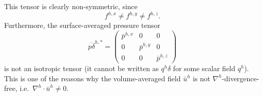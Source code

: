 \documentclass[preprint,twocolumn,5p]{elsarticle}
\begin{document}
This tensor is clearly non-symmetric, since
\begin{equation}
    f^{h, x} \neq f^{h, y} \neq f^{h, z}.
\end{equation}
Furthermore, the surface-averaged pressure tensor
\begin{equation}
    \overline{p \delta}^{h, *} =
    \begin{pmatrix}
        \bar{p}^{h, x} & 0 & 0 \\
        0 & \bar{p}^{h, y} & 0 \\
        0 & 0 & \bar{p}^{h, z}
    \end{pmatrix}
\end{equation}
is not an isotropic tensor
(it cannot be written as $q^h \delta$ for some scalar field $q^h$).
This is one of the reasons why the volume-averaged field $\bar{u}^h$ is not
$\nabla^h$-divergence-free, i.e.\ $\nabla^h \cdot \bar{u}^h \neq 0$.
\end{document}
